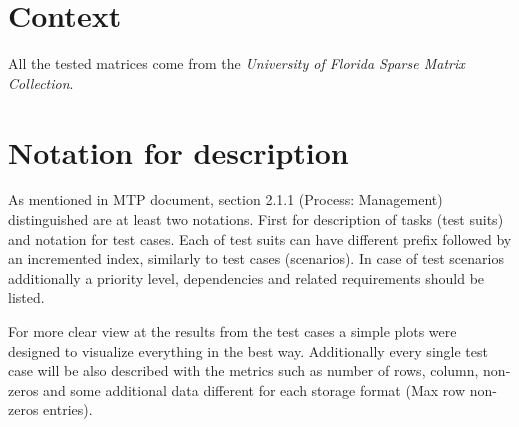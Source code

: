 \section{Context} \label{s:introduction:context}
	\begin{comment}
		Provide any required context that is not already covered by other sections of this document (e.g., thirdparty
		testing via the Internet).
	\end{comment}
	All the tested matrices come from the \emph{University of Florida Sparse Matrix Collection}.
\section{Notation for description} \label{s:introduction:notation-for-description}
	\begin{comment}
		Define any numbering schemes, e.g., for scenarios and test cases. The intent of this section is to
		explain any such schema.
	\end{comment}
	As mentioned in \gls{MTP} document, section 2.1.1 (Process: Management) distinguished are at least two notations. First for description of tasks (test suits) and notation for test cases. Each of test suits can have different prefix followed by an incremented index, similarly to test cases (scenarios). In case of test scenarios additionally a priority level, dependencies and related requirements should be listed.
	
	For more clear view at the results from the test cases a simple plots were designed to visualize everything in the best way. Additionally every single test case will be also described with the metrics such as number of rows, column, non-zeros and some additional data different for each storage format (Max row non-zeros entries).
	